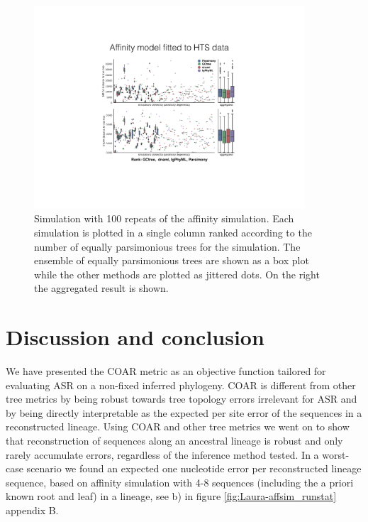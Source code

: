 \begin{figure}[!ht]
    \centering
    \includegraphics[width=0.9\textwidth]{figures/Laura-affsim_valid.pdf}
    \caption{
        \label{fig:Laura-affsim_valid}
        Simulation with 100 repeats of the affinity simulation.
        Each simulation is plotted in a single column ranked according to the number of equally parsimonious trees for the simulation.
        The ensemble of equally parsimonious trees are shown as a box plot while the other methods are plotted as jittered dots.
        On the right the aggregated result is shown.
    }
\end{figure}






\section{Discussion and conclusion}
We have presented the COAR metric as an objective function tailored for evaluating ASR on a non-fixed inferred phylogeny.
COAR is different from other tree metrics by being robust towards tree topology errors irrelevant for ASR and by being directly interpretable as the expected per site error of the sequences in a reconstructed lineage.
Using COAR and other tree metrics we went on to show that reconstruction of sequences along an ancestral lineage is robust and only rarely accumulate errors, regardless of the inference method tested.
In a worst-case scenario we found an expected one nucleotide error per reconstructed lineage sequence, based on affinity simulation with 4-8 sequences (including the a priori known root and leaf) in a lineage, see b) in figure \ref{fig:Laura-affsim_runstat} appendix B.

